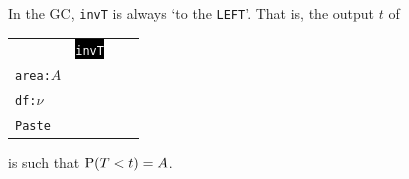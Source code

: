\begin{note}
  In the GC, \texttt{invT} is always `to the \texttt{LEFT}'. That is, the output \(t\) of 
  \begin{center}
    \begin{tabular}{|lScr|}
      \hline
      &\qquad\colorbox{black}{\textcolor{white}{\texttt{invT}}}&\\
      \texttt{area:\(A\)}&&\qquad{}\\
      \texttt{df:\(\nu\)}&&\\
      \texttt{Paste}&&\\
      \hline
    \end{tabular}
  \end{center}
  is such that \(\operatorname{P}(T<t)=A\).
\end{note}
